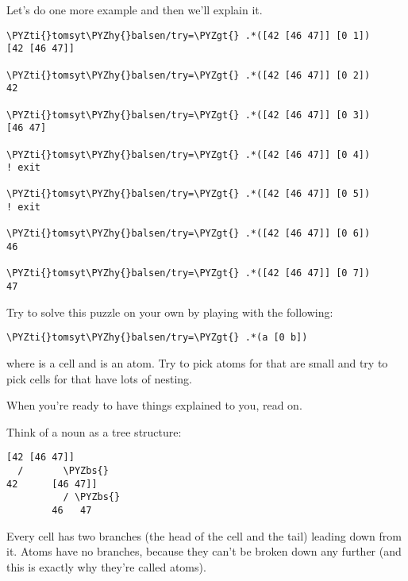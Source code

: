 Let's do one more example and then we'll explain it.
\begin{framed_shaded}
\begin{Verbatim}[fontsize=\relsize{-2.5},fontseries=b,commandchars=\\\{\}]
\PYZti{}tomsyt\PYZhy{}balsen/try=\PYZgt{} .*([42 [46 47]] [0 1])
[42 [46 47]] 

\PYZti{}tomsyt\PYZhy{}balsen/try=\PYZgt{} .*([42 [46 47]] [0 2])
42

\PYZti{}tomsyt\PYZhy{}balsen/try=\PYZgt{} .*([42 [46 47]] [0 3])
[46 47]

\PYZti{}tomsyt\PYZhy{}balsen/try=\PYZgt{} .*([42 [46 47]] [0 4])
! exit

\PYZti{}tomsyt\PYZhy{}balsen/try=\PYZgt{} .*([42 [46 47]] [0 5])
! exit

\PYZti{}tomsyt\PYZhy{}balsen/try=\PYZgt{} .*([42 [46 47]] [0 6])
46

\PYZti{}tomsyt\PYZhy{}balsen/try=\PYZgt{} .*([42 [46 47]] [0 7])
47
\end{Verbatim}
\end{framed_shaded}
Try to solve this puzzle on your own by playing with the following:
\begin{framed_shaded}
\begin{Verbatim}[fontsize=\relsize{-2.5},fontseries=b,commandchars=\\\{\}]
\PYZti{}tomsyt\PYZhy{}balsen/try=\PYZgt{} .*(a [0 b])
\end{Verbatim}
\end{framed_shaded}
where  is a cell and  is an atom. Try to pick atoms for  that are
small and try to pick cells for  that have lots of nesting. 

When you're ready to have things explained to you, read on.

Think of a noun as a tree structure: 
\begin{framed_shaded}
\begin{Verbatim}[fontsize=\relsize{-2.5},fontseries=b,commandchars=\\\{\}]
  [42 [46 47]]
  /       \PYZbs{}
42      [46 47]]
          / \PYZbs{} 
        46   47
\end{Verbatim}
\end{framed_shaded}

Every cell has two branches (the head of the cell and the tail) leading down
from it. Atoms have no branches, because they can't be broken down any further
(and this is exactly why they're called atoms).

